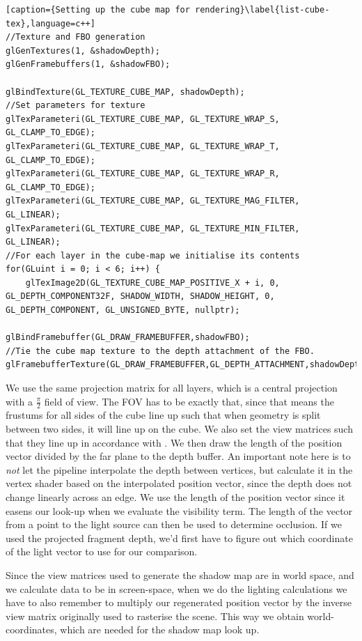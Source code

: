 \begin{lstlisting}[caption={Setting up the cube map for rendering}\label{list-cube-tex},language=c++]
//Texture and FBO generation
glGenTextures(1, &shadowDepth);
glGenFramebuffers(1, &shadowFBO);

glBindTexture(GL_TEXTURE_CUBE_MAP, shadowDepth);
//Set parameters for texture
glTexParameteri(GL_TEXTURE_CUBE_MAP, GL_TEXTURE_WRAP_S, GL_CLAMP_TO_EDGE);
glTexParameteri(GL_TEXTURE_CUBE_MAP, GL_TEXTURE_WRAP_T, GL_CLAMP_TO_EDGE);
glTexParameteri(GL_TEXTURE_CUBE_MAP, GL_TEXTURE_WRAP_R, GL_CLAMP_TO_EDGE);
glTexParameteri(GL_TEXTURE_CUBE_MAP, GL_TEXTURE_MAG_FILTER, GL_LINEAR);
glTexParameteri(GL_TEXTURE_CUBE_MAP, GL_TEXTURE_MIN_FILTER, GL_LINEAR);
//For each layer in the cube-map we initialise its contents
for(GLuint i = 0; i < 6; i++) {
	glTexImage2D(GL_TEXTURE_CUBE_MAP_POSITIVE_X + i, 0, GL_DEPTH_COMPONENT32F, SHADOW_WIDTH, SHADOW_HEIGHT, 0, GL_DEPTH_COMPONENT, GL_UNSIGNED_BYTE, nullptr);
	
glBindFramebuffer(GL_DRAW_FRAMEBUFFER,shadowFBO);
//Tie the cube map texture to the depth attachment of the FBO.
glFramebufferTexture(GL_DRAW_FRAMEBUFFER,GL_DEPTH_ATTACHMENT,shadowDepth,0);
\end{lstlisting}

We use the same projection matrix for all layers, which is a central projection with a $\frac{\pi}{2}$ field of view. The FOV has to be exactly that, since that means the frustums for all sides of the cube line up such that when geometry is split between two sides, it will line up on the cube. We also set the view matrices such that they line up in accordance with \cite{cubetex}. We then draw the length of the position vector divided by the far plane to the depth buffer. An important note here is to \emph{not} let the pipeline interpolate the depth between vertices, but calculate it in the vertex shader based on the interpolated position vector, since the depth does not change linearly across an edge. We use the length of the position vector since it easens our look-up when we evaluate the visibility term. The length of the vector from a point to the light source can then be used to determine occlusion. If we used the projected fragment depth, we'd first have to figure out which coordinate of the light vector to use for our comparison.

Since the view matrices used to generate the shadow map are in world space, and we calculate data to be in screen-space, when we do the lighting calculations we have to also remember to multiply our regenerated position vector by the inverse view matrix originally used to rasterise the scene. This way we obtain world-coordinates, which are needed for the shadow map look up.

